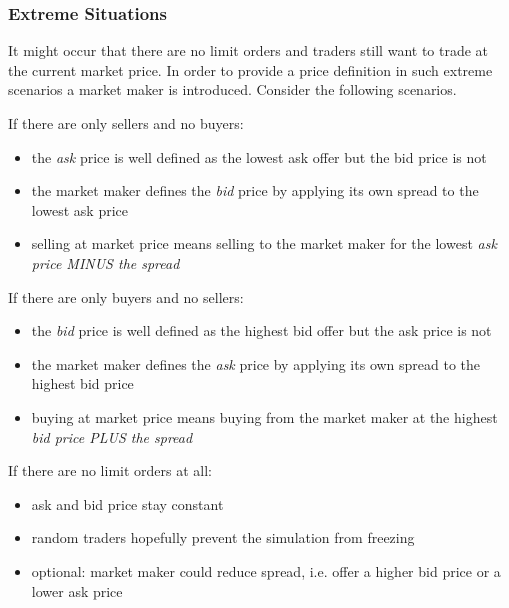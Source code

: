 \subsubsection{Extreme Situations}
It might occur that there are no limit orders and traders still want to trade at the 
current market price. In order to provide a price definition in such extreme scenarios
a market maker is introduced. Consider the following scenarios.

%
If there are only sellers and no buyers:
\begin{itemize}
    \item the \textit{ask} price is well defined as the lowest ask offer but the bid price is not
    \item the market maker defines the \textit{bid} price by applying its own spread to the lowest ask price
    \item selling at market price means selling to the market maker for the lowest \textit{ask price MINUS the spread}
\end{itemize}

If there are only buyers and no sellers:
\begin{itemize}
    \item the \textit{bid} price is well defined as the highest bid offer but the ask price is not
    \item the market maker defines the \textit{ask} price by applying its own spread to the highest bid price
    \item buying at market price means buying from the market maker at the highest \textit{bid price PLUS the spread}
\end{itemize}

If there are no limit orders at all:
\begin{itemize}
    \item ask and bid price stay constant
    \item random traders hopefully prevent the simulation from freezing
    \item optional: market maker could reduce spread, i.e. offer a higher bid price
    or a lower ask price
\end{itemize}

